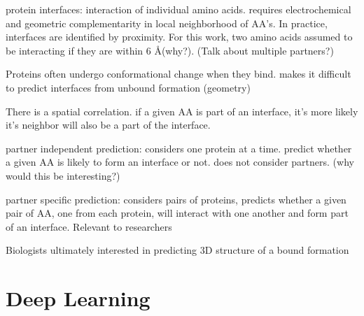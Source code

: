 protein interfaces: interaction of individual amino acids. requires electrochemical and geometric complementarity in local neighborhood of AA's. In practice, interfaces are identified by proximity. For this work, two amino acids assumed to be interacting if they are within 6 \AA (why?). (Talk about multiple partners?)

Proteins often undergo conformational change when they bind. makes it difficult to predict interfaces from unbound formation (geometry)

There is a spatial correlation. if a given AA is part of an interface, it's more likely it's neighbor will also be a part of the interface. 

partner independent prediction: considers one protein at a time. predict whether a given AA is likely to form an interface or not. does not consider partners. (why would this be interesting?)

partner specific prediction: considers pairs of proteins, predicts whether a given pair of AA, one from each protein, will interact with one another and form part of an interface. Relevant to researchers

Biologists ultimately interested in predicting 3D structure of a bound formation


\section{Deep Learning}